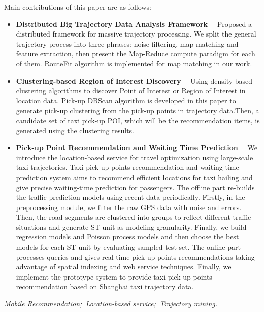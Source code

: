 Main contributions of this paper are as follows:
\begin{itemize}
  \item \textbf{Distributed Big Trajectory Data Analysis Framework} ~~Proposed a distributed framework for massive trajectory processing. We split the general trajectory process into three phrases: noise filtering, map matching and feature extraction, then present the Map-Reduce compute paradigm for each of them. RouteFit algorithm is implemented for map matching in our work.
  \item \textbf{Clustering-based Region of Interest Discovery} ~~Using density-based clustering algorithms to discover Point of Interest or Region of Interest in location data. Pick-up DBScan algorithm is developed in this paper to generate pick-up clustering from the pick-up points in trajectory data.Then, a candidate set of taxi pick-up POI, which will be the recommendation items, is generated using the clustering results.
  \item \textbf{Pick-up Point Recommendation and Waiting Time Prediction} ~~We introduce the location-based service for travel optimization using large-scale taxi trajectories. Taxi pick-up points recommendation and waiting-time prediction system aims to recommend efficient locations for taxi hailing and give precise waiting-time prediction for passengers. The offline part re-builds the traffic prediction models using recent data periodically. Firstly, in the preprocessing module, we filter the raw GPS data with noise and errors. Then, the road segments are clustered into groups to reflect different traffic situations and generate ST-unit as modeling granularity. Finally, we build regression models and Poisson process models and then choose the best models for each ST-unit by evaluating sampled test set. The online part processes queries and gives real time pick-up points recommendations taking advantage of spatial indexing and web service techniques. Finally, we implement the prototype system to provide taxi pick-up points recommendation based on Shanghai taxi trajectory data.
\end{itemize}

\hspace{-0.5cm}
{} \textit{Mobile Recommendation;\, Location-based service;\, Trajectory mining.
}


































